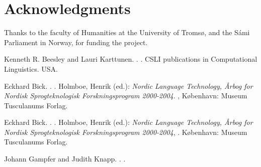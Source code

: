 \documentclass[11pt]{article}
\begin{document}
\section*{Acknowledgments}
Thanks to the faculty of Humanities at the University of Tromsø, and the Sámi Parliament in Norway, for funding the project. %


\begin{thebibliography}{}

{Kenneth R. Beesley and Lauri Karttunen}.
.
.
\newblock CSLI publications in Computational Linguistics.
\newblock USA.

{Eckhard Bick}.
.
.
\newblock Holmboe, Henrik (ed.): {\em Nordic Language Technology, Årbog for Nordisk Sprogteknologisk Forskningsprogram 2000-2004}.
,
\newblock København: Museum Tusculanums Forlag.

{Eckhard Bick}.
.
.
\newblock Holmboe, Henrik (ed.): {\em Nordic Language Technology, Årbog for Nordisk Sprogteknologisk Forskningsprogram 2000-2004},
.
\newblock København: Museum Tusculanums Forlag.


{Johann Gampfer and Judith Knapp}.
.
.



\end{thebibliography}
\end{document}

